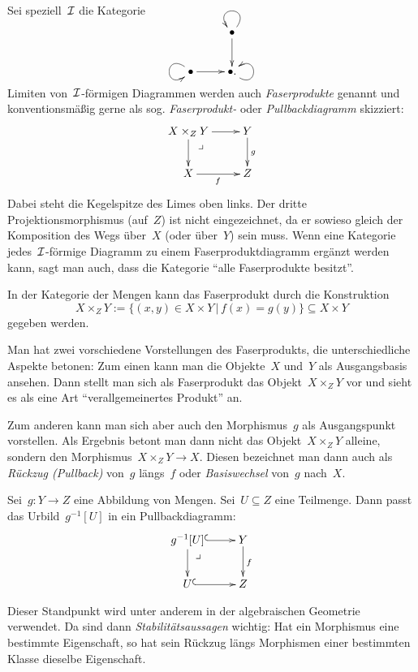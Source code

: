 Sei speziell~$\mathcal{I}$ die Kategorie
\[ \xymatrix{
  & \bullet \ar[d] \ar@(ur,ul) \\
  \bullet \ar[r] \ar@(ul,dl) & \bullet. \ar@(dr,ur)
} \]
Limiten von~$\mathcal{I}$-förmigen Diagrammen werden auch \emph{Faserprodukte} genannt
und konventionsmäßig gerne als sog. \emph{Faserprodukt-} oder
\emph{Pullbackdiagramm} skizziert:
\[ \xymatrix{
  \ar @{} [dr] |{\begin{array}{l}\lrcorner\ \ \ \ \ \ \ \ \ \\\\\end{array}}
  X \times_Z Y \ar[r] \ar[d] & Y \ar[d]^g \\
  X \ar[r]_f & Z
} \]
Dabei steht die Kegelspitze des Limes oben links. Der dritte
Projektionsmorphismus (auf~$Z$) ist nicht eingezeichnet, da er sowieso gleich
der Komposition des Wegs über~$X$ (oder über~$Y$) sein muss. Wenn eine
Kategorie jedes~$\mathcal{I}$-förmige Diagramm zu einem Faserproduktdiagramm ergänzt
werden kann, sagt man auch, dass die Kategorie "`alle Faserprodukte besitzt"'.

In der Kategorie der Mengen kann das Faserprodukt durch die Konstruktion
\[ X \times_Z Y := \{ (x,y) \in X \times Y \,|\, f(x) = g(y) \} \subseteq X \times Y \]
gegeben werden.

Man hat zwei vorschiedene Vorstellungen des Faserprodukts, die unterschiedliche
Aspekte betonen: Zum einen kann man die Objekte~$X$ und~$Y$ als Ausgangsbasis
ansehen. Dann stellt man sich als Faserprodukt das Objekt~$X \times_Z Y$ vor
und sieht es als eine Art "`verallgemeinertes Produkt"' an.

Zum anderen kann man sich aber auch den Morphismus~$g$ als Ausgangspunkt
vorstellen. Als Ergebnis betont man dann nicht das Objekt~$X \times_Z Y$
alleine, sondern den Morphismus~$X \times_Z Y \to X$. Diesen bezeichnet man
dann auch als \emph{Rückzug (Pullback)} von~$g$ längs~$f$ oder
\emph{Basiswechsel} von~$g$ nach~$X$.

\begin{bsp}Sei~$g:Y \to Z$ eine Abbildung von Mengen. Sei~$U \subseteq Z$ eine
Teilmenge. Dann passt das Urbild~$g^{-1}[U]$ in ein Pullbackdiagramm:
\[ \xymatrix{
  \ar @{} [dr] |{\begin{array}{l}\lrcorner\ \ \ \ \ \ \ \ \ \\\\\end{array}}
  g^{-1}[U] \ar@{^{(}->}[r] \ar[d] & Y \ar[d]^f \\
  U \ar@{^{(}->}[r] & Z
} \]
\end{bsp}
Dieser Standpunkt wird unter anderem in der algebraischen Geometrie verwendet. Da
sind dann \emph{Stabilitätsaussagen} wichtig: Hat ein Morphismus eine bestimmte
Eigenschaft, so hat sein Rückzug längs Morphismen einer bestimmten Klasse
dieselbe Eigenschaft.

